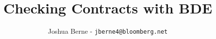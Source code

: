 
\title{Checking Contracts with BDE}
\author[Berne]{Joshua Berne - \texttt{jberne4@bloomberg.net}}

